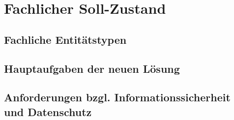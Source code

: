 \section{Fachlicher Soll-Zustand}

\subsection{Fachliche Entitätstypen}
\subsection{Hauptaufgaben der neuen Lösung}
\subsection{Anforderungen bzgl. Informationssicherheit und Datenschutz}
